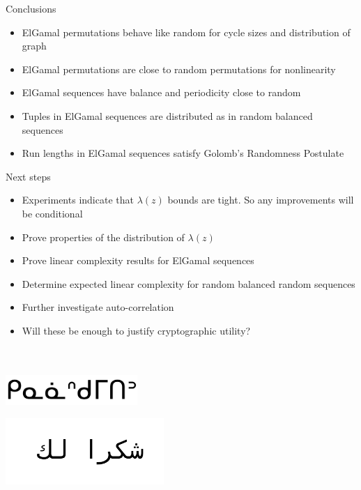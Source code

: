 \begin{frame}{Conclusions}

  \begin{itemize}
    \item ElGamal permutations behave like random for cycle sizes and distribution of graph
    \item ElGamal permutations are close to random permutations for nonlinearity
    \item ElGamal sequences have balance and periodicity close to random
    \item Tuples in ElGamal sequences are distributed as in random balanced sequences
    \item Run lengths in ElGamal sequences satisfy Golomb's Randomness Postulate
    \end{itemize}
  
\end{frame}

\begin{frame}{Next steps}

  \begin{itemize}
  \item Experiments indicate that $\lambda(z)$ bounds are tight.  So any improvements will be conditional
  \item Prove properties of the distribution of $\lambda(z)$
  \item Prove linear complexity results for ElGamal sequences
  \item Determine expected linear complexity for random balanced random sequences
  \item Further investigate auto-correlation
    \item Will these be enough to justify cryptographic utility? 
    \end{itemize}
  
\end{frame}


\begin{frame}{}

  \begin{center}
   \\

   \\

  
  \includegraphics[width=5cm]{kinanaskomitin.png}

  
  
  \includegraphics[width=6cm]{shukran_lak.png}
\end{center}
  
  
\end{frame}




